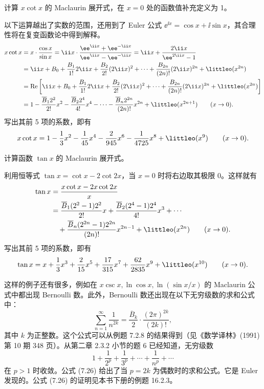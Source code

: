 \begin{xexample}[7.2.8]
计算 $x\cot x$ 的 Maclaurin 展开式，在 $x=0$ 处的函数值补充定义为 1。
\end{xexample}
\begin{xsolution}
以下运算越出了实数的范围，还用到了 Euler 公式 $\ee^{\ii x}=\cos x+\ii\sin x$，其合理性将在复变函数论中得到解释。
\[
  \begin{aligned}
  x\cot x
  &=x\cdot\frac{\cos x}{\sin x}
  =\ii x\cdot\frac{\ee^{\ii x}+\ee^{-\ii x}}{\ee^{\ii x}-\ee^{-\ii x}}
  =\ii x+\frac{2\ii x}{\ee^{2\ii x}-1}\\
  &=\ii x+B_0+\frac{B_1}{1!}2\ii x+\frac{B_2}{2!}(2\ii x)^2+\cdots+\frac{B_{2n}}{(2n)!}(2\ii x)^{2n}+\littleo(x^{2n})\\
  &=\operatorname{Re}\left[\ii x+B_0+\frac{B_1}{1!}2\ii x+\frac{B_2}{2!}(2\ii x)^2+\cdots+\frac{B_{2n}}{(2n)!}(2\ii x)^{2n}+\littleo(x^{2n})\right]\\
  &=1-\frac{\overline B_1 2^2}{2!}x^2-\frac{\overline B_2 2^4}{4!}x^4-\cdots-\frac{\overline B_n2^{2n}}{(2n)!}x^{2n}+\littleo(x^{2n+1})\qquad(x\to0).
  \end{aligned}
\]
写出其前 5 项的系数，即有
\[
  x\cot x=1-\frac13x^2-\frac{1}{45}x^4-\frac{2}{945}x^6-\frac{1}{4725}x^8+\littleo(x^9)\qquad(x\to0).
\]
\end{xsolution}

\begin{xexample}[7.2.9]
计算函数 $\tan x$ 的 Maclaurin 展开式。
\end{xexample}
\begin{xsolution}
利用恒等式 $\tan x=\cot x-2\cot2x$，当 $x=0$ 时将右边取其极限 0。这样就有
\[
  \begin{aligned}
  \tan x
  &=\frac{x\cot x-2x\cot2x}{x}\\
  &=\frac{\overline B_1(2^2-1)2^2}{2!}x
   +\frac{\overline B_2(2^4-1)2^4}{4!}x^3+\cdots\\
  &\quad+\frac{\overline B_n(2^{2n}-1)2^{2n}}{(2n)!}x^{2n-1}+\littleo(x^{2n})\qquad(x\to0).
  \end{aligned}
\]
写出其前 5 项的系数，即有
\[
  \tan x=x+\frac13x^3+\frac{2}{15}x^5+\frac{17}{315}x^7+\frac{62}{2835}x^9+\littleo(x^{10})\qquad(x\to0).
\]
\end{xsolution}

这样的例子还有很多，例如在 $x\csc x,\ln\cos x,\ln(\sin x/x)$ 的 Maclaurin 公式中都出现 Bernoulli 数。此外，Bernoulli 数还出现在以下无穷级数的求和公式中：
\begin{equation}
  \sum_{n=1}^{\infty}\frac{1}{n^{2k}}=\frac{\overline B_k}{2}\cdot\frac{(2\pi)^{2k}}{(2k)!},
  \tag{7.26}
\end{equation}
其中 $k$ 为正整数。这个公式可以从例题 7.2.8 的结果得到（见《数学译林》(1991) 第 10 期 348 页）。从第二章 2.3.2 小节的题 6 已经知道，无穷级数
\[
  1+\frac{1}{2^p}+\frac{1}{3^p}+\cdots+\frac{1}{n^p}+\cdots
\]
在 $p>1$ 时收敛。公式 (7.26) 给出了当 $p=2k$ 为偶数时的求和公式。它是 Euler 发现的。公式 (7.26) 的证明见本书下册的例题 16.2.3。

